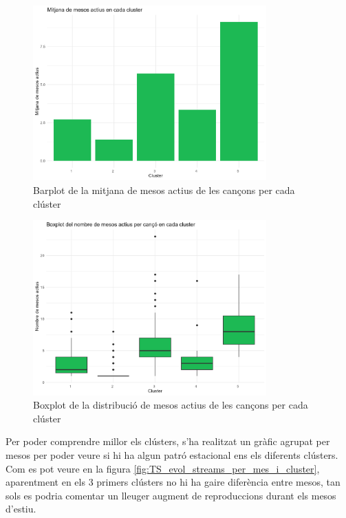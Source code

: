 \documentclass{article}
\begin{document}
\begin{figure}[H]
    \centering
    \includegraphics[width=0.8\textwidth]{Images/4_clustering/time_series/barplot_mitjanes_mesos_actius.png}
    \caption{Barplot de la mitjana de mesos actius de les cançons per cada clúster}
    \label{fig:TS_barplot_mitjanes_mesos_actius}
\end{figure}

\begin{figure}[H]
    \centering
    \includegraphics[width=0.8\textwidth]{Images/4_clustering/time_series/boxplot_mesos_actius.png}
    \caption{Boxplot de la distribució de mesos actius de les cançons per cada clúster}
    \label{fig:TS_boxplot_mesos_actius}
\end{figure}

Per poder comprendre millor els clústers, s'ha realitzat un gràfic agrupat per mesos per poder veure si hi ha algun patró estacional ens els diferents clústers. Com es pot veure en la figura \ref{fig:TS_evol_streams_per_mes_i_cluster}, aparentment en els 3 primers clústers no hi ha gaire diferència entre mesos, tan sols es podria comentar un lleuger augment de reproduccions durant els mesos d'estiu.
\end{document}
